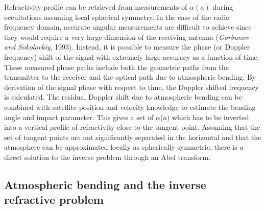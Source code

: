 \documentclass[a4paper,12pt,twoside]{article}
\begin{document}
\noindent Refractivity profile can be retrieved from measurements of $\alpha(a)$ during occultations assuming local spherical symmetry. In the case of the radio frequency domain, accurate angular measurements are difficult to achieve since they would require a very large dimension of the receiving antenna (\textit{Gorbunov and Sokolovkiy}, 1993). Instead, it is possible to measure the phase (or Doppler frequency) shift of the signal with extremely large accuracy as a function of time. These measured phase paths include both the geometric paths from the transmitter to the receiver and the optical path due to atmospheric bending. By derivation of the signal phase with respect to time, the Doppler shifted frequency is calculated. The residual Doppler shift due to atmospheric bending can be combined with satellite position and velocity knowledge to estimate the bending angle and impact parameter. This gives a set of $\alpha$($a$) which has to be inverted into a vertical profile of  refractivity close to the tangent point. Assuming that the set of tangent points are not significantly separated in the horizontal and that the atmosphere can be approximated locally as spherically symmetric, there is a direct solution to the inverse problem through an Abel transform. \\

\subsection{Atmospheric bending and the inverse refractive problem}
\end{document}
